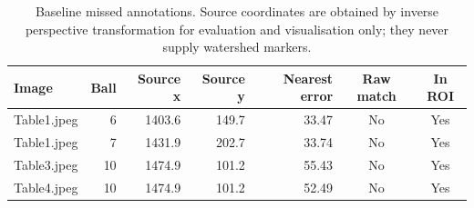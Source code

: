 \begin{table}[htbp]
\centering
\small
\caption{Baseline missed annotations. Source coordinates are obtained by inverse perspective transformation for evaluation and visualisation only; they never supply watershed markers.}
\label{tab:watershed-misses}
\begin{tabular}{lrrrrcc}
\toprule
Image & Ball & Source x & Source y & Nearest error & Raw match & In ROI \\
\midrule
Table1.jpeg & 6 & 1403.6 & 149.7 & 33.47 & No & Yes \\
Table1.jpeg & 7 & 1431.9 & 202.7 & 33.74 & No & Yes \\
Table3.jpeg & 10 & 1474.9 & 101.2 & 55.43 & No & Yes \\
Table4.jpeg & 10 & 1474.9 & 101.2 & 52.49 & No & Yes \\
\bottomrule
\end{tabular}
\end{table}
\FloatBarrier
